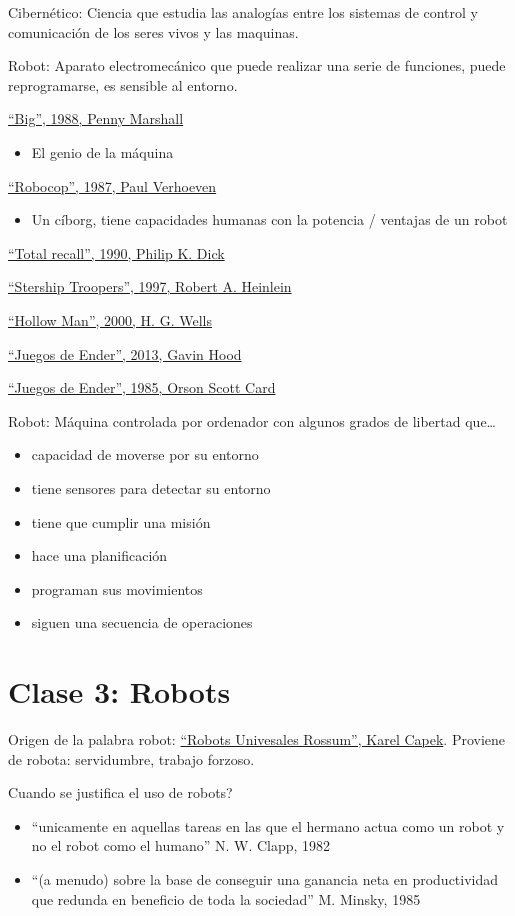 \documentclass[12pt, twoside, openright]{report} %
\begin{document}
Cibernético: Ciencia que estudia las analogías entre los sistemas de control y comunicación de los seres vivos y las maquinas.

Robot: Aparato electromecánico que puede realizar una serie de funciones, puede reprogramarse, es sensible al entorno.

\underline{\enquote{Big}, 1988, Penny Marshall}
\begin{itemize}
	\item El genio de la máquina
\end{itemize}

\underline{\enquote{Robocop}, 1987, Paul Verhoeven}
\begin{itemize}
	\item Un cíborg, tiene capacidades humanas con la potencia / ventajas de un robot
\end{itemize}

\underline{\enquote{Total recall}, 1990, Philip K. Dick}

\underline{\enquote{Stership Troopers}, 1997, Robert A. Heinlein}

\underline{\enquote{Hollow Man}, 2000, H. G. Wells}

\underline{\enquote{Juegos de Ender}, 2013, Gavin Hood}

\underline{\enquote{Juegos de Ender}, 1985, Orson Scott Card}

Robot: Máquina controlada por ordenador con algunos grados de libertad que\dots
\begin{itemize}
	\item capacidad de moverse por su entorno
	\item tiene sensores para detectar su entorno
	\item tiene que cumplir una misión
	\item hace una planificación
	\item programan sus movimientos
	\item siguen una secuencia de operaciones
\end{itemize}

\chapter{Clase 3: Robots}
Origen de la palabra robot: \underline{\enquote{Robots Univesales Rossum}, Karel Capek}. Proviene de robota: servidumbre, trabajo forzoso.

Cuando se justifica el uso de robots?
\begin{itemize}
	\item \enquote{unicamente en aquellas tareas en las que el hermano actua como un robot y no el robot como  el humano} N. W. Clapp, 1982
	\item \enquote{(a menudo) sobre la base de conseguir una ganancia neta en productividad que redunda en beneficio de toda la sociedad} M. Minsky, 1985
\end{itemize}
\end{document}
